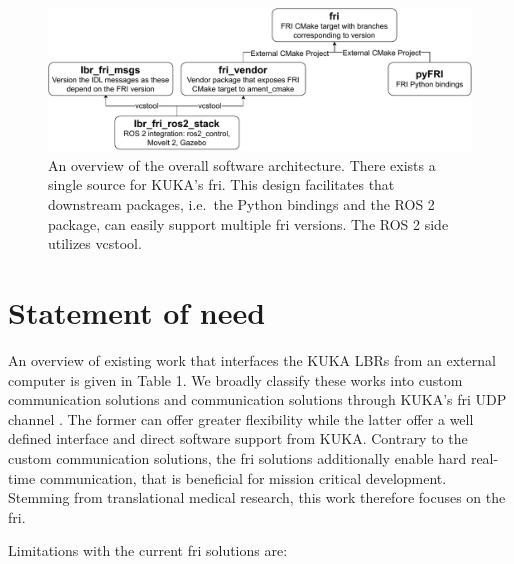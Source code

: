 \begin{figure}
\centering
\includegraphics[width=\textwidth]{appendix_a/img/fri_dependency_architecture.pdf}
\caption[An overview of the overall software architecture. There exists
a single source for KUKA's \acrshort{fri}. This design facilitates that downstream
packages, i.e.~the Python bindings and the ROS 2 package, can easily
support multiple \acrshort{fri} versions. The ROS 2 side utilizes
vcstool.\label{fig:fri}]{An overview of the overall software
architecture. There exists a single source for KUKA's \acrshort{fri}. This design
facilitates that downstream packages, i.e.~the Python bindings and the
ROS 2 package, can easily support multiple \acrshort{fri} versions. The ROS 2 side
utilizes vcstool\footnotemark{}.\label{fig:fri}}
\end{figure}

\hypertarget{statement-of-need}{%
\section{Statement of need}\label{statement-of-need}}

An overview of existing work that interfaces the KUKA LBRs from an
external computer is given in Table 1. We broadly classify these works
into custom communication solutions
\cite{ref-iiwa_stack,ref-kuka_sunrise_toolbox,ref-libiiwa} and
communication solutions through KUKA's \acrshort{fri} UDP channel 
\cite{ref-iiwa_ros2,ref-iiwa_ros}. The
former can offer greater flexibility while the latter offer a well
defined interface and direct software support from KUKA. Contrary to the
custom communication solutions, the \acrshort{fri} solutions additionally enable
hard real-time communication, that is beneficial for mission critical
development. Stemming from translational medical research, this work
therefore focuses on the \acrshort{fri}.

Limitations with the current \acrshort{fri} solutions are:

